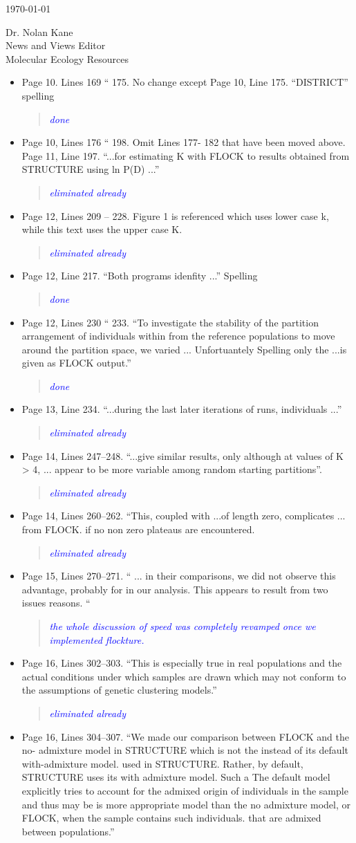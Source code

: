 \documentclass[11pt]{letter}
\newcommand{\reply}[1]{\begin{quotation}\small\sl\textcolor{blue}{#1}\end{quotation}}
\begin{document}
\begin{letter}{ \today 

Dr. Nolan Kane\\
News and Views Editor\\
Molecular Ecology Resources \\
}
\begin{itemize}
\reply{These lines were completely overhauled given the changes in our simulation assessment}
\item Page 10. Lines 169 `` 175. No change except Page 10, Line 175. ``DISTRICT'' spelling
\reply{done}
\item Page 10, Lines 176 `` 198. Omit Lines 177- 182 that have been moved above. Page 11, Line 197. ``...for estimating K with FLOCK to results obtained from
STRUCTURE using ln P(D) ...''
\reply{eliminated already}
\item Page 12, Lines 209 -- 228. Figure 1 is referenced which uses lower case k, while this text
uses the upper case K.
\reply{eliminated already}
\item Page 12, Line 217. ``Both programs idenfity ...'' Spelling
\reply{done}
\item Page 12, Lines 230 `` 233. ``To investigate the stability of the partition arrangement of individuals within from the reference populations to move around the partition space, we varied ... Unfortuantely Spelling only the ...is given as FLOCK output.''
\reply{done}
\item Page 13, Line 234. ``...during the last later iterations of runs, individuals ...''
\reply{eliminated already}
\item Page 14, Lines 247--248. ``...give similar results, only although at values of K > 4, ...
appear to be more variable among random starting partitions''.
\reply{eliminated already}
\item Page 14, Lines 260--262. ``This, coupled with ...of length zero, complicates ... from
FLOCK. if no non zero plateaus are encountered.
\reply{eliminated already}
\item Page 15, Lines 270--271. `` ... in their comparisons, we did not observe this advantage,
probably for in our analysis. This appears to result from two issues reasons. ``
\reply{the whole discussion of speed was completely revamped once we implemented {\sc flockture}.}
\item Page 16, Lines 302--303. ``This is especially true in real populations and the actual conditions under which samples are drawn which may not conform to the assumptions of genetic clustering models.''
\reply{eliminated already}
\item Page 16, Lines 304--307. ``We made our comparison between FLOCK and the no- admixture model in STRUCTURE which is not the instead of its default with-admixture model. used in STRUCTURE. Rather, by default, STRUCTURE uses its with admixture model. Such a The default model explicitly tries to account for the admixed origin of individuals in the sample and thus may be is more appropriate model than the no admixture model, or FLOCK, when the sample contains such individuals. that are admixed between populations.''

\end{itemize}
\end{letter}
\end{document}
